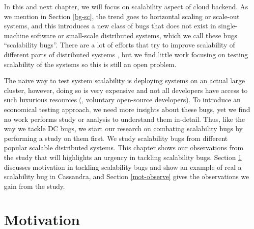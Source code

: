 In this and next chapter, we will focus on scalability aspect of cloud backend.
As we mention in Section \ref{bg-sc}, the trend goes to horizontal scaling or
scale-out systems, and this introduces a new class of bugs that does not exist
in single-machine software or small-scale distributed systems, which we call
these bugs ``scalability bugs''. 
%
There are a lot of efforts that try to improve scalability of different parts of
distributed systems \cite{Boutin+14-Apollo, Ousterhout+13-Sparrow,
Ganjam+15-C3Video, Glendenning+11-Scatter, Lloyd+11-COPS}, but we find little
work focusing on testing scalability of the systems \cite{Gupta+08-DieCast,
Wang+14-Exalt} so this is still an open problem.

The naive way to test system scalability is deploying systems on an actual large
cluster, however, doing so is very expensive and not all developers have access
to such luxurious resources (\eg, voluntary open-source developers). To
introduce an economical testing approach, we need more insights about these
bugs, yet we find no work performs study or analysis to understand them
in-detail. Thus, like the way we tackle DC bugs, we start our research on
combating scalability bugs by performing a study on them first. We study
\totAll scalability bugs from different popular scalable distributed systems. 
%
This chapter shows our observations from the study that will highlights an
urgency in tackling scalability bugs. Section \ref{sec-scb-mot} discusses
motivation in tackling scalability bugs and show an example of real a
scalability bug in Cassandra, and Section \ref{mot-observe} gives the
observations we gain from the study.
%

\section{Motivation}
\label{sec-scb-mot}

